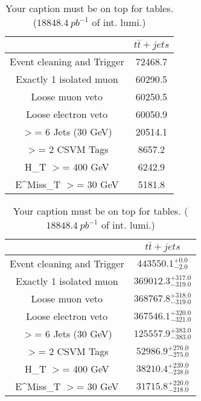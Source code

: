 \documentclass{article}
\begin{document}
\begin{table}
\caption{Your caption must be on top for tables. ($18848.4~pb^{-1}$ of int. lumi.)}
\label{tab:}
\centering
\begin{tabular}{|c|c|}
\toprule
&$t\bar{t}+jets$	\\

\midrule
Event cleaning and Trigger&	72468.7	\\

Exactly 1 isolated muon&	60290.5	\\

Loose muon veto&	60250.5	\\

Loose electron veto&	60050.9	\\

$>$= 6 Jets (30 GeV)&	20514.1	\\

$>$= 2 CSVM Tags&	8657.2	\\

H_{T} $>$=  400 GeV&	6242.9	\\

E^{Miss}_{T} $>$=  30 GeV&	5181.8	\\

\bottomrule
\end{tabular}
\end{table}
\begin{table}
\caption{Your caption must be on top for tables. ($18848.4~pb^{-1}$ of int. lumi.)}
\label{tab:}
\centering
\begin{tabular}{|c|c|}
\toprule
&$t\bar{t}+jets$	\\

\midrule
Event cleaning and Trigger&	$443550.1^{+0.0}_{-2.0}$	\\

Exactly 1 isolated muon&	$369012.3^{+317.0}_{-319.0}$	\\

Loose muon veto&	$368767.8^{+318.0}_{-319.0}$	\\

Loose electron veto&	$367546.1^{+320.0}_{-321.0}$	\\

$>$= 6 Jets (30 GeV)&	$125557.9^{+383.0}_{-383.0}$	\\

$>$= 2 CSVM Tags&	$52986.9^{+276.0}_{-275.0}$	\\

H_{T} $>$=  400 GeV&	$38210.4^{+239.0}_{-238.0}$	\\

E^{Miss}_{T} $>$=  30 GeV&	$31715.8^{+220.0}_{-218.0}$	\\

\bottomrule
\end{tabular}
\end{table}
\end{document}
